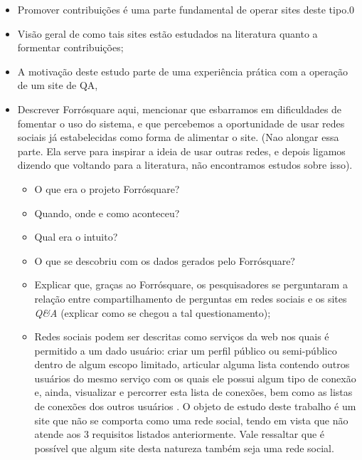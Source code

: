 \begin{itemize}
        \item Promover contribuições é uma parte fundamental de operar sites deste tipo.0
        \item Visão geral de como tais sites estão estudados na literatura quanto a formentar contribuições;
        \item A motivação deste estudo parte de uma experiência prática com a operação de um site de QA,
        \item Descrever Forrósquare aqui, mencionar que esbarramos em dificuldades de fomentar o uso do sistema, e que percebemos a oportunidade de usar redes sociais já estabelecidas como forma de alimentar o site. (Nao alongar essa parte. Ela serve para inspirar a ideia de usar outras redes, e depois ligamos dizendo que voltando para a literatura, não encontramos estudos sobre isso).
            \begin{itemize}
                \item O que era o projeto Forrósquare?
                \item Quando, onde e como aconteceu?
                \item Qual era o intuito?
                \item O que se descobriu com os dados gerados pelo Forrósquare?
                \item Explicar que, graças ao Forrósquare, os pesquisadores se perguntaram a relação entre compartilhamento de perguntas em redes sociais e os sites \textit{Q\&A} (explicar como se chegou a tal questionamento);
                \item Redes sociais podem ser descritas como serviços da web nos quais é permitido a um dado usuário: criar um perfil público ou semi-público dentro de algum escopo limitado, articular alguma lista contendo outros usuários do mesmo serviço com os quais ele possui algum tipo de conexão e, ainda, visualizar e percorrer esta lista de conexões, bem como as listas de conexões dos outros usuários \cite{ellison2007social}. O objeto de estudo deste trabalho é um site \qa que não se comporta como uma rede social, tendo em vista que não atende aos 3 requisitos listados anteriormente. Vale ressaltar que é possível que algum site desta natureza também seja uma rede social. 
            \end{itemize}

\end{itemize}
